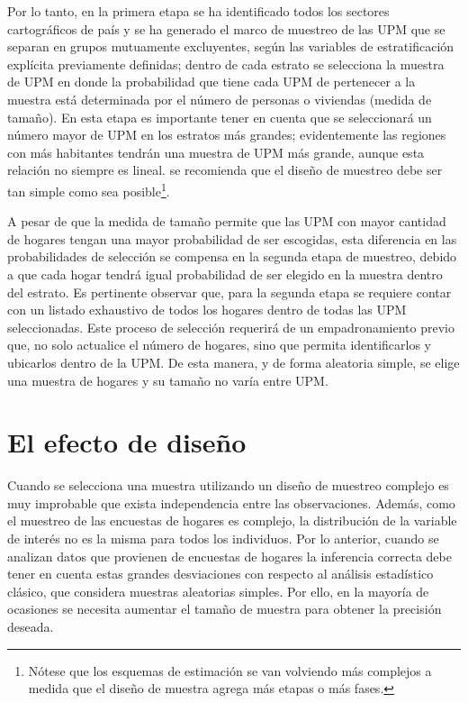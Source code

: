 \documentclass[
  10pt,
  spanish,
]{book}
\begin{document}
Por lo tanto, en la primera etapa se ha identificado todos los sectores cartográficos de país y se ha generado el marco de muestreo de las UPM que se separan en grupos mutuamente excluyentes, según las variables de estratificación explícita previamente definidas; dentro de cada estrato se selecciona la muestra de UPM en donde la probabilidad que tiene cada UPM de pertenecer a la muestra está determinada por el número de personas o viviendas (medida de tamaño). En esta etapa es importante tener en cuenta que se seleccionará un número mayor de UPM en los estratos más grandes; evidentemente las regiones con más habitantes tendrán una muestra de UPM más grande, aunque esta relación no siempre es lineal. se recomienda que el diseño de muestreo debe ser tan simple como sea posible\footnote{Nótese que los esquemas de estimación se van volviendo más complejos a medida que el diseño de muestra agrega más etapas o más fases.}.

A pesar de que la medida de tamaño permite que las UPM con mayor cantidad de hogares tengan una mayor probabilidad de ser escogidas, esta diferencia en las probabilidades de selección se compensa en la segunda etapa de muestreo, debido a que cada hogar tendrá igual probabilidad de ser elegido en la muestra dentro del estrato. Es pertinente observar que, para la segunda etapa se requiere contar con un listado exhaustivo de todos los hogares dentro de todas las UPM seleccionadas. Este proceso de selección requerirá de un empadronamiento previo que, no solo actualice el número de hogares, sino que permita identificarlos y ubicarlos dentro de la UPM. De esta manera, y de forma aleatoria simple, se elige una muestra de hogares y su tamaño no varía entre UPM.

\hypertarget{el-efecto-de-diseuxf1o}{%
\chapter{El efecto de diseño}\label{el-efecto-de-diseuxf1o}}

Cuando se selecciona una muestra utilizando un diseño de muestreo complejo es muy improbable que exista independencia entre las observaciones. Además, como el muestreo de las encuestas de hogares es complejo, la distribución de la variable de interés no es la misma para todos los individuos. Por lo anterior, cuando se analizan datos que provienen de encuestas de hogares la inferencia correcta debe tener en cuenta estas grandes desviaciones con respecto al análisis estadístico clásico, que considera muestras aleatorias simples. Por ello, en la mayoría de ocasiones se necesita aumentar el tamaño de muestra para obtener la precisión deseada.
\end{document}
